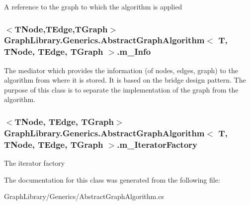 A reference to the graph to which the algorithm is applied 

\hypertarget{class_graph_library_1_1_generics_1_1_abstract_graph_algorithm_ad93dc80869889f95dd6588d6a07703d7}{}
\subsubsection[{m\+\_\+\+Info}]{$<$T\+Node,T\+Edge,T\+Graph$>$ {\bf Graph\+Library.\+Generics.\+Abstract\+Graph\+Algorithm}$<$ T, T\+Node, T\+Edge, T\+Graph $>$.m\+\_\+\+Info\hspace{0.3cm}{\ttfamily [protected]}}\label{class_graph_library_1_1_generics_1_1_abstract_graph_algorithm_ad93dc80869889f95dd6588d6a07703d7}


The mediator which provides the information (of nodes, edges, graph) to the algorithm from where it is stored. It is based on the bridge design pattern. The purpose of this class is to separate the implementation of the graph from the algorithm. 

\hypertarget{class_graph_library_1_1_generics_1_1_abstract_graph_algorithm_a1f64fc66f6f6ccef709df92d3e6081b2}{}
\subsubsection[{m\+\_\+\+Iterator\+Factory}]{$<$T\+Node, T\+Edge, T\+Graph$>$ {\bf Graph\+Library.\+Generics.\+Abstract\+Graph\+Algorithm}$<$ T, T\+Node, T\+Edge, T\+Graph $>$.m\+\_\+\+Iterator\+Factory\hspace{0.3cm}{\ttfamily [protected]}}\label{class_graph_library_1_1_generics_1_1_abstract_graph_algorithm_a1f64fc66f6f6ccef709df92d3e6081b2}


The iterator factory 



The documentation for this class was generated from the following file\+:\begin{DoxyCompactItemize}
\item 
Graph\+Library/\+Generics/Abstract\+Graph\+Algorithm.\+cs\end{DoxyCompactItemize}
